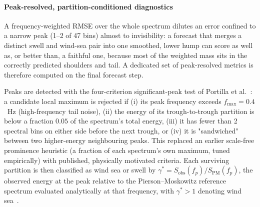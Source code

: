 \paragraph{Peak-resolved, partition-conditioned diagnostics}
A frequency-weighted RMSE over the whole spectrum dilutes an error confined to a narrow peak (1--2 of 47 bins) almost to invisibility: a forecast that merges a distinct swell and wind-sea pair into one smoothed, lower hump can score as well as, or better than, a faithful one, because most of the weighted mass sits in the correctly predicted shoulders and tail. A dedicated set of peak-resolved metrics is therefore computed on the final forecast step.

Peaks are detected with the four-criterion significant-peak test of Portilla et al.~\cite{portilla2009}: a candidate local maximum is rejected if (i) its peak frequency exceeds $f_{\max} = 0.4$~Hz (high-frequency tail noise), (ii) the energy of its trough-to-trough partition is below a fraction $0.05$ of the spectrum's total energy, (iii) it has fewer than 2 spectral bins on either side before the next trough, or (iv) it is "sandwiched" between two higher-energy neighbouring peaks. This replaced an earlier scale-free prominence heuristic (a fraction of each spectrum's own maximum, tuned empirically) with published, physically motivated criteria. Each surviving partition is then classified as wind sea or swell by $\gamma^{*} = S_{\text{obs}}(f_p)/S_{\text{PM}}(f_p)$, the observed energy at the peak relative to the Pierson--Moskowitz reference spectrum evaluated analytically at that frequency, with $\gamma^{*} > 1$ denoting wind sea~\cite{violantecarvalho2009}.

